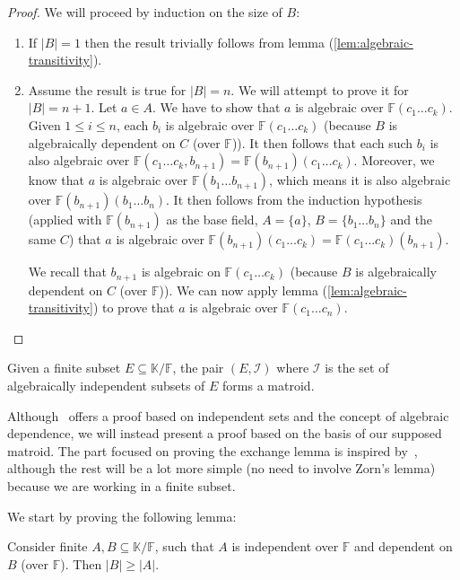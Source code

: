 \begin{proof}
	We will proceed by induction on the size of $B$:
	\begin{enumerate}
		\item If $|B| = 1$ then the result trivially follows from lemma (\ref{lem:algebraic-transitivity}).
		\item Assume the result is true for $|B| = n$. We will attempt to prove it for $|B| = n + 1$. Let $a \in A$. We have to show that $a$ is algebraic over $\mathbb{F}(c _1 \ldots c _k )$. Given $1 \leq i \leq n$, each $b _i$ is algebraic over $\mathbb{F}(c _1 \ldots c _k )$ (because $B$ is algebraically dependent on $C$ (over $\mathbb{F}$)). It then follows that each such $b _i $ is also algebraic over $\mathbb{F}(c _1 \ldots c _k, b _{n + 1}) = \mathbb{F} (b _{n + 1} )(c _1 \ldots c _k )$. Moreover, we know that $a$ is algebraic over $\mathbb{F} (b _1 \ldots b _{n + 1})$, which means it is also algebraic over $\mathbb{F} (b _{n + 1})(b _1 \ldots b _n )$. It then follows from the induction hypothesis (applied with $\mathbb{F} (b _{n + 1})$ as the base field, $A = \{a\}$, $B = \{b _1 \ldots b _n \}$ and the same $C$) that $a$ is algebraic over $\mathbb{F} (b _{n + 1})(c _1 \ldots c _k ) = \mathbb{F} (c _1 \ldots c _k )(b _{n + 1})$.

		      We recall that $b _{n + 1}$ is algebraic on $\mathbb{F} (c _1 \ldots c _k )$ (because $B$ is algebraically dependent on $C$ (over $\mathbb{F} $)). We can now apply lemma (\ref{lem:algebraic-transitivity}) to prove that $a$ is algebraic over $\mathbb{F} (c _1 \ldots c _n)$.
	\end{enumerate}
\end{proof}

\begin{theorem}\label{thm:algebraic-matroids-are-matroids}
	Given a finite subset $E \subseteq \mathbb K / \mathbb F$, the pair $(E, \mathcal I)$  where $\mathcal I$ is the set of algebraically independent subsets of $E$ forms a matroid.
\end{theorem}

Although~\cite{oxley1} offers a proof based on independent sets and the concept of algebraic dependence, we will instead present a proof based on the basis of our supposed matroid. The part focused on proving the exchange lemma is inspired by~\cite{milne2022}, although the rest will be a lot more simple (no need to involve Zorn's lemma) because we are working in a finite subset.


We start by proving the following lemma:
\begin{lemma}\label{lem:algebraic-indep-smaller-than-dep}
	Consider finite $A, B \subseteq \mathbb K / \mathbb F$, such that $A$ is independent over $\mathbb F$ and dependent on $B$ (over $\mathbb F$). Then $|B| \geq |A|$.
\end{lemma}

